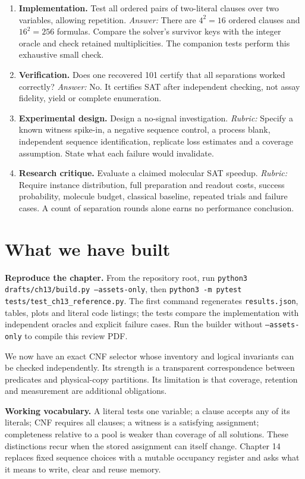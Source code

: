 \begin{enumerate}
Correlated or sequence-dependent losses need a different model.
\item \textbf{Implementation.} Test all ordered pairs of two-literal clauses
over two variables, allowing repetition. \textit{Answer:} There are
$4^2=16$ ordered clauses and $16^2=256$ formulas. Compare the solver's
survivor keys with the integer oracle and check retained multiplicities.
The companion tests perform this exhaustive small check.
\item \textbf{Verification.} Does one recovered 101 certify that all
separations worked correctly? \textit{Answer:} No. It certifies SAT after
independent checking, not assay fidelity, yield or complete enumeration.
\item \textbf{Experimental design.} Design a no-signal investigation.
\textit{Rubric:} Specify a known witness spike-in, a negative sequence control,
a process blank, independent sequence identification, replicate loss estimates
and a coverage assumption. State what each failure would invalidate.
\item \textbf{Research critique.} Evaluate a claimed molecular SAT speedup.
\textit{Rubric:} Require instance distribution, full preparation and readout
costs, success probability, molecule budget, classical baseline, repeated
trials and failure cases. A count of separation rounds alone earns no
performance conclusion.
\end{enumerate}

\section{What we have built}
\textbf{Reproduce the chapter.} From the repository root, run
\texttt{python3 drafts/ch13/build.py --assets-only}, then
\texttt{python3 -m pytest tests/test\_ch13\_reference.py}.
The first command regenerates \texttt{results.json}, tables, plots and literal
code listings; the tests compare the implementation with independent
oracles and explicit failure cases. Run the builder without
\texttt{--assets-only} to compile this review PDF.

We now have an exact CNF selector whose inventory and logical invariants
can be checked independently. Its strength is a transparent correspondence
between predicates and physical-copy partitions. Its limitation is that
coverage, retention and measurement are additional obligations.

\textbf{Working vocabulary.} A literal tests one variable; a clause accepts
any of its literals; CNF requires all clauses; a witness is a satisfying
assignment; completeness relative to a pool is weaker than coverage of
all solutions. These distinctions recur when the stored assignment can
itself change. Chapter 14 replaces fixed sequence choices with a mutable
occupancy register and asks what it means to write, clear and reuse memory.
